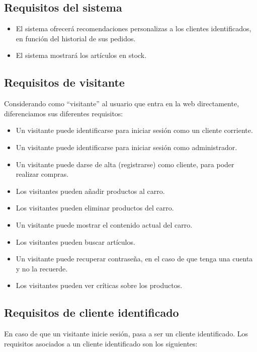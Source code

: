 \subsection{Requisitos del sistema}

\begin{itemize}
\item El sistema ofrecerá recomendaciones personalizas a los clientes identificados, en función del historial de sus pedidos.
\item El sistema mostrará los artículos en stock.
\end{itemize}

\subsection{Requisitos de visitante}

Considerando como ``visitante'' al usuario que entra en la web directamente, diferenciamos sus diferentes requisitos:

\begin{itemize}
\item Un visitante puede identificarse para iniciar sesión como un cliente corriente.
\item Un visitante puede identificarse para iniciar sesión como administrador.
\item Un visitante puede darse de alta (registrarse) como cliente, para poder realizar compras.
\item Los visitantes pueden añadir productos al carro.
\item Los visitantes pueden eliminar productos del carro.
\item Un visitante puede mostrar el contenido actual del carro.
\item Los visitantes pueden buscar artículos.
\item Un visitante puede recuperar contraseña, en el caso de que tenga una cuenta y no la recuerde.
\item Los visitantes pueden ver críticas sobre los productos.
\end{itemize}

\subsection{Requisitos de cliente identificado}

En caso de que un visitante inicie sesión, pasa a ser un cliente identificado. Los requisitos asociados a un cliente identificado son los siguientes:

